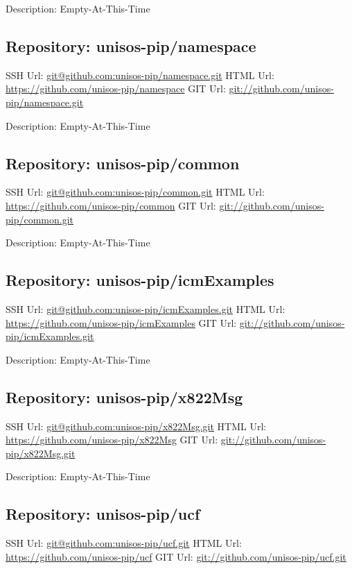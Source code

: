 Description: Empty-At-This-Time

\subsection{Repository: unisos-pip/namespace}

SSH Url:  \url{git@github.com:unisos-pip/namespace.git}
HTML Url: \url{https://github.com/unisos-pip/namespace}
GIT Url:  \url{git://github.com/unisos-pip/namespace.git}

Description: Empty-At-This-Time

\subsection{Repository: unisos-pip/common}

SSH Url:  \url{git@github.com:unisos-pip/common.git}
HTML Url: \url{https://github.com/unisos-pip/common}
GIT Url:  \url{git://github.com/unisos-pip/common.git}

Description: Empty-At-This-Time

\subsection{Repository: unisos-pip/icmExamples}

SSH Url:  \url{git@github.com:unisos-pip/icmExamples.git}
HTML Url: \url{https://github.com/unisos-pip/icmExamples}
GIT Url:  \url{git://github.com/unisos-pip/icmExamples.git}

Description: Empty-At-This-Time

\subsection{Repository: unisos-pip/x822Msg}

SSH Url:  \url{git@github.com:unisos-pip/x822Msg.git}
HTML Url: \url{https://github.com/unisos-pip/x822Msg}
GIT Url:  \url{git://github.com/unisos-pip/x822Msg.git}

Description: Empty-At-This-Time

\subsection{Repository: unisos-pip/ucf}

SSH Url:  \url{git@github.com:unisos-pip/ucf.git}
HTML Url: \url{https://github.com/unisos-pip/ucf}
GIT Url:  \url{git://github.com/unisos-pip/ucf.git}

